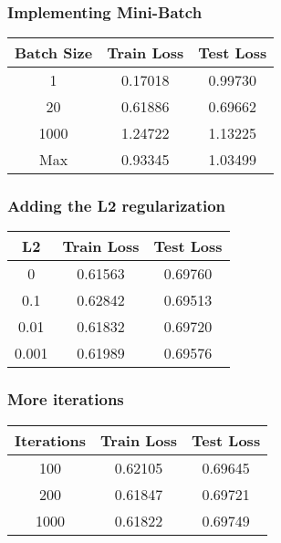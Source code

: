 \documentclass[
	letterpaper, %
	10pt, %
]{class}
\begin{document}
\subsubsection{Implementing Mini-Batch}

\begin{center}
	\begin{tabular}{ |c|c|c| }
		\hline
		Batch Size & Train Loss & Test Loss \\
		\hline
		1          & 0.17018    & 0.99730   \\
		20         & 0.61886    & 0.69662   \\
		1000       & 1.24722    & 1.13225   \\
		Max        & 0.93345    & 1.03499   \\
		\hline
	\end{tabular}
\end{center}

\subsubsection{Adding the L2 regularization}

\begin{center}
	\begin{tabular}{ |c|c|c| }
		\hline
		L2    & Train Loss & Test Loss \\
		\hline
		0     & 0.61563    & 0.69760   \\
		0.1   & 0.62842    & 0.69513   \\
		0.01  & 0.61832    & 0.69720   \\
		0.001 & 0.61989    & 0.69576   \\
		\hline
	\end{tabular}
\end{center}

\subsubsection{More iterations}

\begin{center}
	\begin{tabular}{ |c|c|c| }
		\hline
		Iterations & Train Loss & Test Loss \\
		\hline
		100        & 0.62105    & 0.69645   \\
		200        & 0.61847    & 0.69721   \\
		1000       & 0.61822    & 0.69749   \\
		\hline
	\end{tabular}
\end{center}
\end{document}
